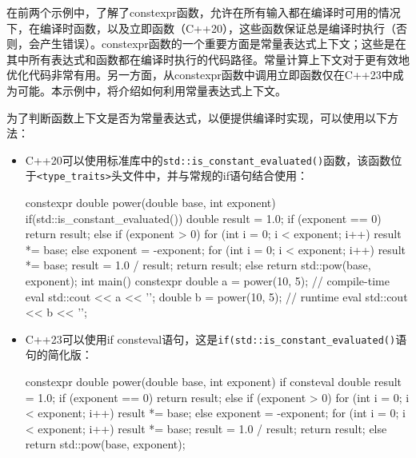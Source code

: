 
在前两个示例中，了解了constexpr函数，允许在所有输入都在编译时可用的情况下，在编译时函数，以及立即函数（C++20），这些函数保证总是编译时执行（否则，会产生错误）。constexpr函数的一个重要方面是常量表达式上下文；这些是在其中所有表达式和函数都在编译时执行的代码路径。常量计算上下文对于更有效地优化代码非常有用。另一方面，从constexpr函数中调用立即函数仅在C++23中成为可能。本示例中，将介绍如何利用常量表达式上下文。



为了判断函数上下文是否为常量表达式，以便提供编译时实现，可以使用以下方法：

\begin{itemize}
\item
C++20可以使用标准库中的\verb|std::is_constant_evaluated()|函数，该函数位于\verb|<type_traits>|头文件中，并与常规的if语句结合使用：

\begin{cpp}
constexpr double power(double base, int exponent)
{
    if(std::is_constant_evaluated())
    {
        double result = 1.0;
        if (exponent == 0)
        {
            return result;
        }
        else if (exponent > 0) {
            for (int i = 0; i < exponent; i++) {
                result *= base;
            }
        }
        else {
            exponent = -exponent;
            for (int i = 0; i < exponent; i++) {
                result *= base;
            }
            result = 1.0 / result;
        }
        return result;
    }
    else
    {
        return std::pow(base, exponent);
    }
}
int main()
{
    constexpr double a = power(10, 5); // compile-time eval
    std::cout << a << '\n';
    double b = power(10, 5);           // runtime eval
    std::cout << b << '\n';
}
\end{cpp}

\item
C++23可以使用if consteval语句，这是\verb|if(std::is_constant_evaluated()|语句的简化版：

\begin{cpp}
constexpr double power(double base, int exponent)
{
    if consteval
    {
        double result = 1.0;
        if (exponent == 0)
        {
            return result;
        }
        else if (exponent > 0) {
            for (int i = 0; i < exponent; i++) {
                result *= base;
            }
        }
        else {
            exponent = -exponent;
            for (int i = 0; i < exponent; i++) {
                result *= base;
            }
            result = 1.0 / result;
        }
        return result;
    }
    else
    {
        return std::pow(base, exponent);
    }
}
\end{cpp}
\end{itemize}

